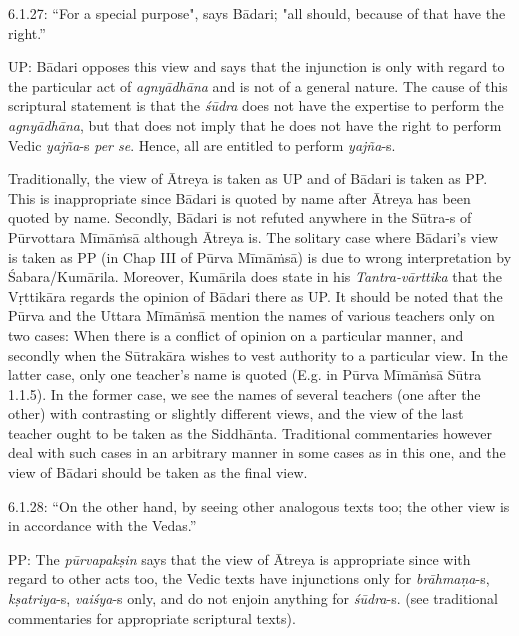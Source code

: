\vspace{.1cm}

6.1.27: “For a special purpose", says Bādari; "all should, because of that have the right.”

\vspace{.1cm}

UP: Bādari opposes this view and says that the injunction is only with regard to the particular act of \textit{agnyādhāna} and is not of a general nature. The cause of this scriptural statement is that the \textit{śūdra} does not have the expertise to perform the \textit{agnyādhāna}, but that does not imply that he does not have the right to perform Vedic \textit{yajña}-s \textit{per se}. Hence, all are entitled to perform \textit{yajña}-s.

\vspace{.1cm}

Traditionally, the view of Ātreya is taken as UP and of Bādari is taken as PP. This is inappropriate since Bādari is quoted by name after Ātreya has been quoted by name. Secondly, Bādari is not refuted anywhere in the Sūtra-s of Pūrvottara Mīmāṁsā although Ātreya is. The solitary case where Bādari’s view is taken as PP (in Chap III of Pūrva Mīmāṁsā) is due to wrong interpretation by Śabara/Kumārila. Moreover, Kumārila does state in his \textit{Tantra-vārttika} that the Vṛttikāra regards the opinion of Bādari there as UP. It should be noted that the Pūrva and the Uttara Mīmāṁsā mention the names of various teachers only on two cases: When there is a conflict of opinion on a particular manner, and secondly when the Sūtrakāra wishes to vest authority to a particular view. In the latter case, only one teacher’s name is quoted (E.g. in Pūrva Mīmāṁsā Sūtra 1.1.5). In the former case, we see the names of several teachers (one after the other) with contrasting or slightly different views, and the view of the last teacher ought to be taken as the Siddhānta. Traditional commentaries however deal with such cases in an arbitrary manner in some cases as in this one, and the view of Bādari should be taken as the final view.

\vspace{.1cm}

6.1.28: “On the other hand, by seeing other analogous texts too; the other view is in accordance with the Vedas.”

\vspace{.1cm}

PP: The \textit{pūrvapakṣin} says that the view of Ātreya is appropriate since with regard to other acts too, the Vedic texts have injunctions only for \textit{brāhmaṇa}-s, \textit{kṣatriya}-s, \textit{vaiśya}-s only, and do not enjoin anything for \textit{śūdra}-s. (see traditional commentaries for appropriate scriptural texts).

